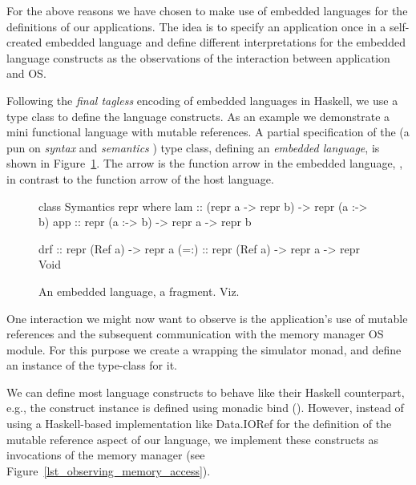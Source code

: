 For the above reasons we have chosen to make use of embedded languages for the definitions of our applications.
The idea is to specify an application once in a self-created embedded language and define different interpretations for the embedded language constructs as the observations of the interaction between application and OS\nolinebreak[3]  \cite{Hofer:2008:PED:1449913.1449935}.

Following the \emph{final tagless} \cite{final_tagless_embedding} encoding of embedded languages in Haskell, we use a type class to define the language constructs.
As an example we demonstrate a mini functional language with mutable references.
A partial specification of the  (a pun on \emph{syntax} and \emph{semantics} \cite{final_tagless_embedding}) type class, defining an \emph{embedded language}, is shown in Figure~\ref{fig:embedded_language_interface}.
The arrow \hs{:->} is the function arrow in the embedded language, \eg {}, in contrast to the function arrow \hs{->} of the host language.

\begin{figure}
\begin{code}
class Symantics repr where
  lam   :: (repr a -> repr b) -> repr (a :-> b)
  app   :: repr (a :-> b) -> repr a -> repr b

  drf   :: repr (Ref a) -> repr a
  (=:)  :: repr (Ref a) -> repr a -> repr Void
\end{code}
\caption{An embedded language, a fragment. Viz.~\cite{final_tagless_embedding}}
\label{fig:embedded_language_interface}
\end{figure}

One interaction we might now want to observe is the application's use of mutable references and the subsequent communication with the memory manager OS module.
For this purpose we create a  wrapping the simulator monad, and define an instance of the  type-class for it.

We can define most language constructs to behave like their Haskell counterpart, e.g., the  construct instance is defined using monadic bind (\hs{>>=}\xspace).
However, instead of using a Haskell-based implementation like \textsf{Data.IORef} for the definition of the mutable reference aspect of our language, we implement these constructs as invocations of the memory manager (see Figure~\ref{lst_observing_memory_access}).

